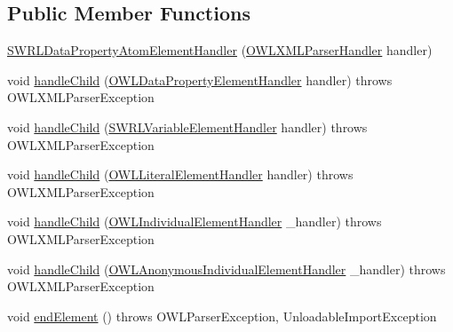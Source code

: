 \subsection*{Public Member Functions}
\begin{DoxyCompactItemize}
\item 
\hyperlink{classorg_1_1coode_1_1owlapi_1_1owlxmlparser_1_1_s_w_r_l_data_property_atom_element_handler_aa27e05f61ff8b7599a2c308cae97323b}{S\-W\-R\-L\-Data\-Property\-Atom\-Element\-Handler} (\hyperlink{classorg_1_1coode_1_1owlapi_1_1owlxmlparser_1_1_o_w_l_x_m_l_parser_handler}{O\-W\-L\-X\-M\-L\-Parser\-Handler} handler)
\item 
void \hyperlink{classorg_1_1coode_1_1owlapi_1_1owlxmlparser_1_1_s_w_r_l_data_property_atom_element_handler_af5ad53e2739f31f295375901a667cca3}{handle\-Child} (\hyperlink{classorg_1_1coode_1_1owlapi_1_1owlxmlparser_1_1_o_w_l_data_property_element_handler}{O\-W\-L\-Data\-Property\-Element\-Handler} handler)  throws O\-W\-L\-X\-M\-L\-Parser\-Exception 
\item 
void \hyperlink{classorg_1_1coode_1_1owlapi_1_1owlxmlparser_1_1_s_w_r_l_data_property_atom_element_handler_aa31e8b624a81964e439f604a735d9ca7}{handle\-Child} (\hyperlink{classorg_1_1coode_1_1owlapi_1_1owlxmlparser_1_1_s_w_r_l_variable_element_handler}{S\-W\-R\-L\-Variable\-Element\-Handler} handler)  throws O\-W\-L\-X\-M\-L\-Parser\-Exception 
\item 
void \hyperlink{classorg_1_1coode_1_1owlapi_1_1owlxmlparser_1_1_s_w_r_l_data_property_atom_element_handler_a07a77f0f1188f116d13b3b3e33fbf68c}{handle\-Child} (\hyperlink{classorg_1_1coode_1_1owlapi_1_1owlxmlparser_1_1_o_w_l_literal_element_handler}{O\-W\-L\-Literal\-Element\-Handler} handler)  throws O\-W\-L\-X\-M\-L\-Parser\-Exception 
\item 
void \hyperlink{classorg_1_1coode_1_1owlapi_1_1owlxmlparser_1_1_s_w_r_l_data_property_atom_element_handler_a3c3b7928b0b002464b38e0c4aed1d1b3}{handle\-Child} (\hyperlink{classorg_1_1coode_1_1owlapi_1_1owlxmlparser_1_1_o_w_l_individual_element_handler}{O\-W\-L\-Individual\-Element\-Handler} \-\_\-handler)  throws O\-W\-L\-X\-M\-L\-Parser\-Exception 
\item 
void \hyperlink{classorg_1_1coode_1_1owlapi_1_1owlxmlparser_1_1_s_w_r_l_data_property_atom_element_handler_ac6df638c2c1d4038d57af3229f23fd49}{handle\-Child} (\hyperlink{classorg_1_1coode_1_1owlapi_1_1owlxmlparser_1_1_o_w_l_anonymous_individual_element_handler}{O\-W\-L\-Anonymous\-Individual\-Element\-Handler} \-\_\-handler)  throws O\-W\-L\-X\-M\-L\-Parser\-Exception 
\item 
void \hyperlink{classorg_1_1coode_1_1owlapi_1_1owlxmlparser_1_1_s_w_r_l_data_property_atom_element_handler_ab01f6ed2c4e53d19097d19bfe6025397}{end\-Element} ()  throws O\-W\-L\-Parser\-Exception, Unloadable\-Import\-Exception 
\end{DoxyCompactItemize}
